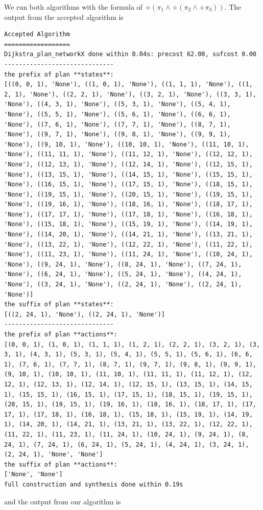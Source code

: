 We run both algorithms with the formula of $\diamond (\pi_1 \land \diamond(\pi_2 \land \diamond \pi_3))$. The output from the accepted algorithm is
\begin{lstlisting}
Accepted Algorithm
==================
Dijkstra_plan_networkX done within 0.04s: precost 62.00, sufcost 0.00
------------------------------
the prefix of plan **states**:
[((0, 0, 1), 'None'), ((1, 0, 1), 'None'), ((1, 1, 1), 'None'), ((1, 2, 1), 'None'), ((2, 2, 1), 'None'), ((3, 2, 1), 'None'), ((3, 3, 1), 'None'), ((4, 3, 1), 'None'), ((5, 3, 1), 'None'), ((5, 4, 1), 'None'), ((5, 5, 1), 'None'), ((5, 6, 1), 'None'), ((6, 6, 1), 'None'), ((7, 6, 1), 'None'), ((7, 7, 1), 'None'), ((8, 7, 1), 'None'), ((9, 7, 1), 'None'), ((9, 8, 1), 'None'), ((9, 9, 1), 'None'), ((9, 10, 1), 'None'), ((10, 10, 1), 'None'), ((11, 10, 1), 'None'), ((11, 11, 1), 'None'), ((11, 12, 1), 'None'), ((12, 12, 1), 'None'), ((12, 13, 1), 'None'), ((12, 14, 1), 'None'), ((12, 15, 1), 'None'), ((13, 15, 1), 'None'), ((14, 15, 1), 'None'), ((15, 15, 1), 'None'), ((16, 15, 1), 'None'), ((17, 15, 1), 'None'), ((18, 15, 1), 'None'), ((19, 15, 1), 'None'), ((20, 15, 1), 'None'), ((19, 15, 1), 'None'), ((19, 16, 1), 'None'), ((18, 16, 1), 'None'), ((18, 17, 1), 'None'), ((17, 17, 1), 'None'), ((17, 18, 1), 'None'), ((16, 18, 1), 'None'), ((15, 18, 1), 'None'), ((15, 19, 1), 'None'), ((14, 19, 1), 'None'), ((14, 20, 1), 'None'), ((14, 21, 1), 'None'), ((13, 21, 1), 'None'), ((13, 22, 1), 'None'), ((12, 22, 1), 'None'), ((11, 22, 1), 'None'), ((11, 23, 1), 'None'), ((11, 24, 1), 'None'), ((10, 24, 1), 'None'), ((9, 24, 1), 'None'), ((8, 24, 1), 'None'), ((7, 24, 1), 'None'), ((6, 24, 1), 'None'), ((5, 24, 1), 'None'), ((4, 24, 1), 'None'), ((3, 24, 1), 'None'), ((2, 24, 1), 'None'), ((2, 24, 1), 'None')]
the suffix of plan **states**:
[((2, 24, 1), 'None'), ((2, 24, 1), 'None')]
------------------------------
the prefix of plan **actions**:
[(0, 0, 1), (1, 0, 1), (1, 1, 1), (1, 2, 1), (2, 2, 1), (3, 2, 1), (3, 3, 1), (4, 3, 1), (5, 3, 1), (5, 4, 1), (5, 5, 1), (5, 6, 1), (6, 6, 1), (7, 6, 1), (7, 7, 1), (8, 7, 1), (9, 7, 1), (9, 8, 1), (9, 9, 1), (9, 10, 1), (10, 10, 1), (11, 10, 1), (11, 11, 1), (11, 12, 1), (12, 12, 1), (12, 13, 1), (12, 14, 1), (12, 15, 1), (13, 15, 1), (14, 15, 1), (15, 15, 1), (16, 15, 1), (17, 15, 1), (18, 15, 1), (19, 15, 1), (20, 15, 1), (19, 15, 1), (19, 16, 1), (18, 16, 1), (18, 17, 1), (17, 17, 1), (17, 18, 1), (16, 18, 1), (15, 18, 1), (15, 19, 1), (14, 19, 1), (14, 20, 1), (14, 21, 1), (13, 21, 1), (13, 22, 1), (12, 22, 1), (11, 22, 1), (11, 23, 1), (11, 24, 1), (10, 24, 1), (9, 24, 1), (8, 24, 1), (7, 24, 1), (6, 24, 1), (5, 24, 1), (4, 24, 1), (3, 24, 1), (2, 24, 1), 'None', 'None']
the suffix of plan **actions**:
['None', 'None']
full construction and synthesis done within 0.19s 
\end{lstlisting}
and the output from our algorithm is 

